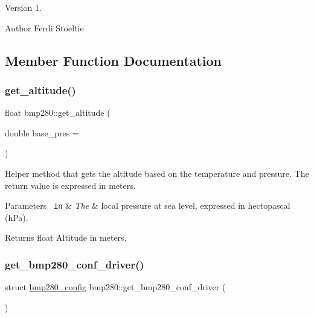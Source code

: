 \begin{DoxyVersion}{Version}
1. 
\end{DoxyVersion}
\begin{DoxyAuthor}{Author}
Ferdi Stoeltie 
\end{DoxyAuthor}


\subsection{Member Function Documentation}
\mbox{\label{classbmp280_a0a480dfb132b8efc68f8a9ab00c8d75b}} 
\subsubsection{\texorpdfstring{get\_altitude()}{get\_altitude()}}
{\footnotesize\ttfamily float bmp280\+::get\+\_\+altitude (\begin{DoxyParamCaption}\item[{double}]{base\+\_\+pres = {} }\end{DoxyParamCaption})}



Helper method that gets the altitude based on the temperature and pressure. The return value is expressed in meters. 


\begin{DoxyParams}[1]{Parameters}
\mbox{\texttt{ in}}  & {\em The} & local pressure at sea level, expressed in hectopascal (h\+Pa). \\
\hline
\end{DoxyParams}
\begin{DoxyReturn}{Returns}
float Altitude in meters. 
\end{DoxyReturn}
\mbox{\label{classbmp280_aa69aa6f655ea7a82e78da96f54aadfb8}} 
\subsubsection{\texorpdfstring{get\_bmp280\_conf\_driver()}{get\_bmp280\_conf\_driver()}}
{\footnotesize\ttfamily struct \mbox{\hyperlink{structbmp280__config}{bmp280\+\_\+config}} bmp280\+::get\+\_\+bmp280\+\_\+conf\+\_\+driver (\begin{DoxyParamCaption}{ }\end{DoxyParamCaption})}



